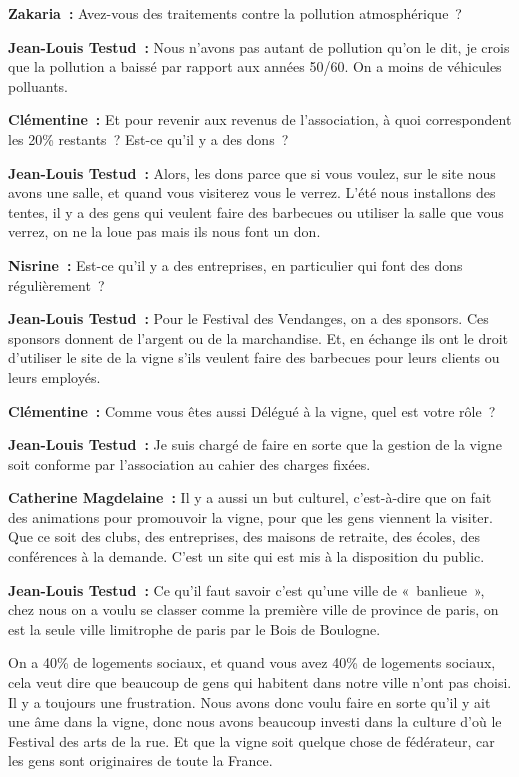 \documentclass[a4paper, titlepage]{report}
\begin{document}
\textbf{Zakaria~:} Avez-vous des traitements contre la pollution
atmosphérique~?

\textbf{Jean-Louis Testud~:} Nous n'avons pas autant de pollution qu'on
le dit, je crois que la pollution a baissé par rapport aux années 50/60.
On a moins de véhicules polluants.

\textbf{Clémentine~:} Et pour revenir aux revenus de l'association, à
quoi correspondent les 20\% restants~? Est-ce qu'il y a des dons~?

\textbf{Jean-Louis Testud~:} Alors, les dons parce que si vous voulez,
sur le site nous avons une salle, et quand vous visiterez vous le
verrez. L'été nous installons des tentes, il y a des gens qui veulent
faire des barbecues ou utiliser la salle que vous verrez, on ne la loue
pas mais ils nous font un don.

\textbf{Nisrine~:} Est-ce qu'il y a des entreprises, en particulier qui
font des dons régulièrement~?

\textbf{Jean-Louis Testud~:} Pour le Festival des Vendanges, on a des
sponsors. Ces sponsors donnent de l'argent ou de la marchandise. Et, en
échange ils ont le droit d'utiliser le site de la vigne s'ils veulent
faire des barbecues pour leurs clients ou leurs employés.

\textbf{Clémentine~:} Comme vous êtes aussi Délégué à la vigne, quel est
votre rôle~?

\textbf{Jean-Louis Testud~:} Je suis chargé de faire en sorte que la
gestion de la vigne soit conforme par l'association au cahier des
charges fixées.

\textbf{Catherine Magdelaine~:} Il y a aussi un but culturel,
c'est-à-dire que on fait des animations pour promouvoir la vigne, pour
que les gens viennent la visiter. Que ce soit des clubs, des
entreprises, des maisons de retraite, des écoles, des conférences à la
demande. C'est un site qui est mis à la disposition du public.

\textbf{Jean-Louis Testud~:} Ce qu'il faut savoir c'est qu'une ville de
«~banlieue~», chez nous on a voulu se classer comme la première ville de
province de paris, on est la seule ville limitrophe de paris par le Bois
de Boulogne.

On a 40\% de logements sociaux, et quand vous avez 40\% de logements
sociaux, cela veut dire que beaucoup de gens qui habitent dans notre
ville n'ont pas choisi. Il y a toujours une frustration. Nous avons donc
voulu faire en sorte qu'il y ait une âme dans la vigne, donc nous avons
beaucoup investi dans la culture d'où le Festival des arts de la rue.
Et que la vigne soit quelque chose de fédérateur, car les gens sont
originaires de toute la France.
\end{document}

